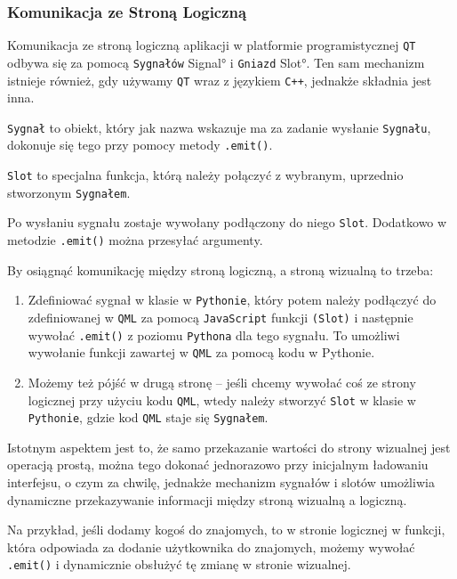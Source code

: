 \subsubsection{Komunikacja ze Stroną Logiczną}
\label{sec:KomunikacjaZeStronaLogiczna}
Komunikacja ze stroną logiczną aplikacji w platformie programistycznej \texttt{QT} odbywa się za pomocą \texttt{Sygnałów} \ang{Signal} i \texttt{Gniazd} \ang{Slot}. Ten sam mechanizm istnieje również, gdy używamy \texttt{QT} wraz z językiem \texttt{C++}, jednakże składnia jest inna. 

\texttt{Sygnał} to obiekt, który jak nazwa wskazuje ma za zadanie wysłanie \texttt{Sygnału}, dokonuje się tego przy pomocy metody \texttt{.emit()}.

\texttt{Slot} to specjalna funkcja, którą należy połączyć z wybranym, uprzednio stworzonym \texttt{Sygnałem}.

Po wysłaniu sygnału zostaje wywołany podłączony do niego \texttt{Slot}. Dodatkowo w metodzie \texttt{.emit()} można przesyłać argumenty.

By osiągnąć komunikację między stroną logiczną, a stroną wizualną to trzeba:

\begin{enumerate}
    \item Zdefiniować sygnał w klasie w \texttt{Pythonie}, który potem należy podłączyć do zdefiniowanej w \texttt{QML} za pomocą \texttt{JavaScript} funkcji \texttt{(Slot)} i następnie wywołać \texttt{.emit()} z poziomu \texttt{Pythona} dla tego sygnału. To umożliwi wywołanie funkcji zawartej w \texttt{QML} za pomocą kodu w Pythonie.
    \item Możemy też pójść w drugą stronę – jeśli chcemy wywołać coś ze strony logicznej przy użyciu kodu \texttt{QML}, wtedy należy stworzyć \texttt{Slot} w klasie w \texttt{Pythonie}, gdzie kod \texttt{QML} staje się \texttt{Sygnałem}.
\end{enumerate}

Istotnym aspektem jest to, że samo przekazanie wartości do strony wizualnej jest operacją prostą, można tego dokonać jednorazowo przy inicjalnym ładowaniu interfejsu, o czym za chwilę, jednakże mechanizm sygnałów i slotów umożliwia dynamiczne przekazywanie informacji między stroną wizualną a logiczną.

Na przykład, jeśli dodamy kogoś do znajomych, to w stronie logicznej w funkcji, która odpowiada za dodanie użytkownika do znajomych, możemy wywołać \texttt{.emit()} i dynamicznie obsłużyć tę zmianę w stronie wizualnej.

